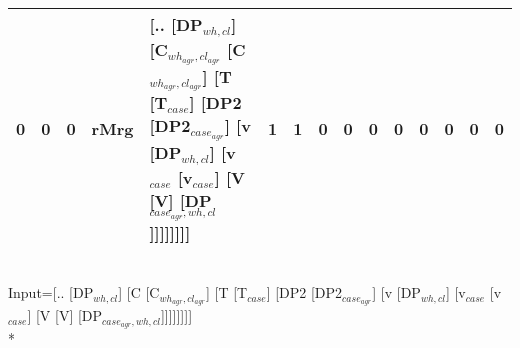 \begin{tabularx}{\linewidth}{rrrlXrrrrrrrrrr}
   0 &       0 &   0 & rMrg & [.. [DP$_{wh,cl}$] [C$_{wh_{agr},cl_{agr}}$ [C$_{wh_{agr},cl_{agr}}$] [T [T$_{case}$] [DP2 [DP2$_{case_{agr}}$] [v [DP$_{wh,cl}$] [v$_{case}$ [v$_{case}$] [V [V] [DP$_{case_{agr},wh,cl}$]]]]]]]]                                                                                                                                         &             1 &             1 &                  0 &            0 &                0 &              0 &        0 &             0 &        0 &             0 \\
\hline
\end{tabularx}\endgroup\\
\begingroup\scriptsize Input=[.. [DP$_{wh,cl}$] [C [C$_{wh_{agr},cl_{agr}}$] [T [T$_{case}$] [DP2 [DP2$_{case_{agr}}$] [v [DP$_{wh,cl}$] [v$_{case}$ [v$_{case}$] [V [V] [DP$_{case_{agr},wh,cl}$]]]]]]]]\\*
